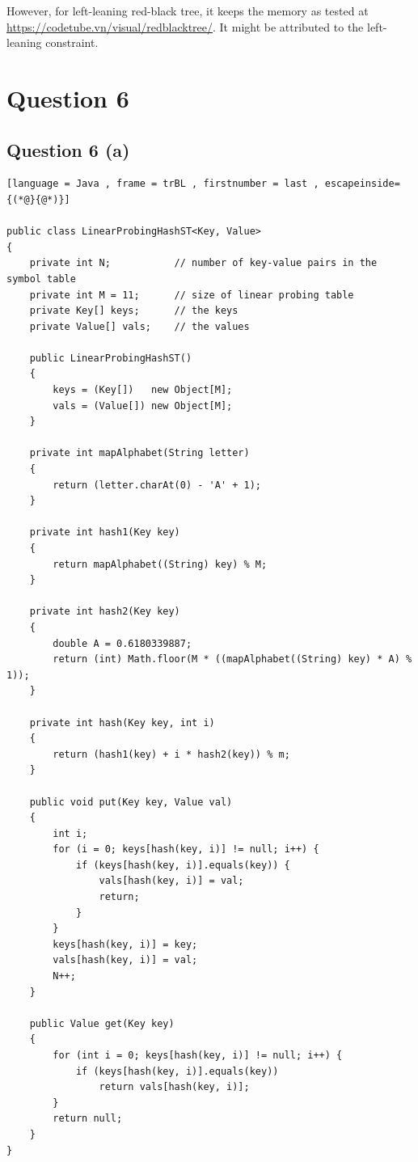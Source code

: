 \documentclass[11pt]{article}
\begin{document}
However, for left-leaning red-black tree, it keeps the memory as tested at \url{https://codetube.vn/visual/redblacktree/}. It might be attributed to the left-leaning constraint.




\section{Question 6}
\subsection{Question 6 (a)}
\begin{lstlisting}[language = Java , frame = trBL , firstnumber = last , escapeinside={(*@}{@*)}]

public class LinearProbingHashST<Key, Value> 
{
    private int N;           // number of key-value pairs in the symbol table
    private int M = 11;      // size of linear probing table
    private Key[] keys;      // the keys
    private Value[] vals;    // the values

    public LinearProbingHashST() 
    {
        keys = (Key[])   new Object[M];
        vals = (Value[]) new Object[M];
    }

    private int mapAlphabet(String letter) 
    {
        return (letter.charAt(0) - 'A' + 1);
    }

    private int hash1(Key key) 
    {
        return mapAlphabet((String) key) % M;
    }

    private int hash2(Key key) 
    {
        double A = 0.6180339887;
        return (int) Math.floor(M * ((mapAlphabet((String) key) * A) % 1));
    }

    private int hash(Key key, int i) 
    {
        return (hash1(key) + i * hash2(key)) % m;
    }

    public void put(Key key, Value val) 
    {
        int i;
        for (i = 0; keys[hash(key, i)] != null; i++) {
            if (keys[hash(key, i)].equals(key)) {
                vals[hash(key, i)] = val;
                return;
            }
        }
        keys[hash(key, i)] = key;
        vals[hash(key, i)] = val;
        N++;
    }

    public Value get(Key key) 
    {
        for (int i = 0; keys[hash(key, i)] != null; i++) {
            if (keys[hash(key, i)].equals(key))
                return vals[hash(key, i)];
        }
        return null;
    }
}

\end{lstlisting}
\end{document}
